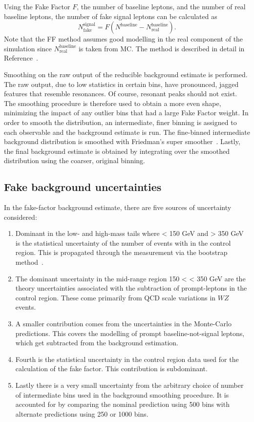 Using the Fake Factor $F$, the number of baseline leptons, and the number of real baseline leptons, the number of fake signal leptons can be calculated as
\begin{equation}
    N_{\text{fake}}^{\text{signal}} = F(N^{\text{baseline}}-N^{\text{baseline}}_{\text{real}}).
\end{equation}
Note that the FF method assumes good modelling in the real component of the simulation since $N^{\text{baseline}}_{\text{real}}$ is taken from MC. The method is described in detail in Reference~\cite{ATLAS-CONF-2014-058}.

Smoothing on the raw output of the reducible background estimate is performed. The raw output, due to low statistics in certain bins, have pronounced, jagged features that resemble resonances. Of course, resonant peaks should not exist. The smoothing procedure is therefore used to obtain a more even shape, minimizing the impact of any outlier bins that had a large Fake Factor weight. In order to smooth the distribution, an intermediate, finer binning is assigned to each observable and the background estimate is run. The fine-binned intermediate background distribution is smoothed with Friedman's super smoother~\cite{DAGOSTINI1995487}. Lastly, the final background estimate is obtained by integrating over the smoothed distribution using the coarser, original binning. 

\subsection{Fake background uncertainties}
\label{ssec:fakeuncertainty}

In the fake-factor background estimate, there are five sources of uncertainty considered:
\begin{enumerate}
    \item Dominant in the low- and high-mass tails where \mFourL < 150 GeV and \mFourL > 350 GeV is the statistical uncertainty of the number of events with in the control region. This is propagated through the measurement via the bootstrap method~\cite{bootstrap_method}.
    \item The dominant uncertainty in the mid-range region 150 < \mFourL < 350 GeV are the theory uncertainties associated with the subtraction of prompt-leptons in the control region. These come primarily from QCD scale variations in $WZ$ events. 
    \item A smaller contribution comes from the uncertainties in the Monte-Carlo predictions. This covers the modelling of prompt baseline-not-signal leptons, which get subtracted from the background estimation.  
    \item Fourth is the statistical uncertainty in the control region data used for the calculation of the fake factor. This contribution is subdominant. 
    \item Lastly there is a very small uncertainty from the arbitrary choice of number of intermediate bins used in the background smoothing procedure. It is accounted for by comparing the nominal prediction using 500 bins with alternate predictions using 250 or 1000 bins. 
\end{enumerate}
